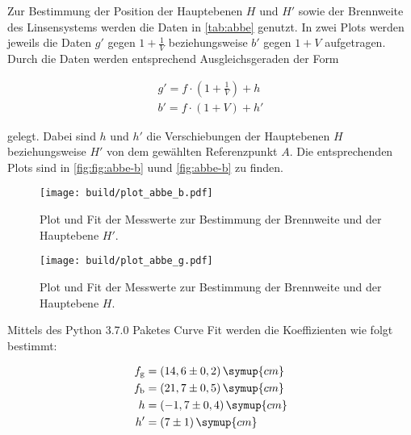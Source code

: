

Zur Bestimmung der Position der Hauptebenen $H$ und $H'$ sowie der Brennweite des Linsensystems werden die Daten in \autoref{tab:abbe} genutzt.
In zwei Plots werden jeweils die Daten $g'$ gegen $1 + \frac{1}{V}$ beziehungsweise $b'$ gegen $1 + V$ aufgetragen.
Durch die Daten werden entsprechend Ausgleichsgeraden der Form

\begin{align}
  g' = f \cdot (1 + \frac{1}{V}) + h\\
  b' = f \cdot (1 + V) + h'
\end{align}

gelegt. Dabei sind $h$ und $h'$ die Verschiebungen der Hauptebenen $H$ beziehungsweise $H'$ von dem gewählten Referenzpunkt $A$.
Die entsprechenden Plots sind in \autoref{fig:fig:abbe-b} uund \autoref{fig:abbe-b} zu finden.

\begin{figure}
  \centering
  \texttt{[image: build/plot\_abbe\_b.pdf]}
  \caption{Plot und Fit der Messwerte zur Bestimmung der Brennweite und der Hauptebene $H'$.}
  \label{fig:abbe-b}
\end{figure}

\begin{figure}
  \centering
  \texttt{[image: build/plot\_abbe\_g.pdf]}
  \caption{Plot und Fit der Messwerte zur Bestimmung der Brennweite und der Hauptebene $H$.}
  \label{fig:abbe-g}
\end{figure}

Mittels des Python 3.7.0 Paketes Curve Fit werden die Koeffizienten wie folgt bestimmt:

\begin{align*}
  f_\text{g} &= (14,6 \pm 0,2) \, \symup{cm}\\
  f_\text{b} &= (21,7 \pm 0,5) \, \symup{cm}\\
  h  &= (-1,7 \pm 0,4) \, \symup{cm}\\
  h' &= (7 \pm 1) \, \symup{cm}
\end{align*}